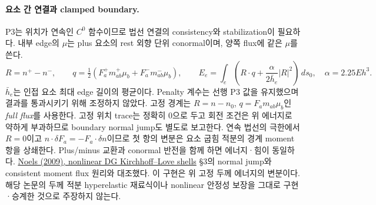 \documentclass[10pt]{article}
\begin{document}
\paragraph{요소 간 연결과 clamped boundary.}
P3는 위치가 연속인 \(C^0\) 함수이므로 법선 연결의 consistency와 stabilization이 필요하다.
내부 edge의 \(\mu\)는 plus 요소의 rest 외향 단위 conormal이며, 양쪽 flux에 같은 \(\mu\)를 쓴다.
\begin{equation}
 R=n^+-n^-,\qquad
 q=\tfrac12\left(F_a^+m_{ab}^+\mu_b+F_a^-m_{ab}^-\mu_b\right),\qquad
 E_e=\int_e\left(R\cdot q+\frac{\alpha}{2\bar h_e}|R|^2\right)\,ds_0,
 \quad \alpha=2.25Eh^3.
 \label{eq:r1-p3-shell-edge}
\end{equation}
\(\bar h_e\)는 인접 요소 최대 edge 길이의 평균이다. Penalty 계수는 선행 P3 값을 유지했으며
결과를 통과시키기 위해 조정하지 않았다. 고정 경계는 \(R=n-n_0\),
\(q=F_am_{ab}\mu_b\)인 \emph{full flux}를 사용한다. 고정 위치 trace는 정확히 0으로 두고
회전 조건은 위 에너지로 약하게 부과하므로 boundary normal jump도 별도로 보고한다.
연속 법선의 극한에서 \(R=0\)이고
\(n\cdot\delta F_a=-F_a\cdot\delta n\)이므로 첫 항의 변분은 요소 굽힘 적분의 경계 moment 항을 상쇄한다.
Plus/minus 교환과 conormal 반전을 함께 하면 에너지·힘이 동일하다.
\href{https://orbi.uliege.be/handle/2268/2093}{Noels (2009), nonlinear DG Kirchhoff--Love shells}
\S3의 normal jump와 consistent moment flux 원리와 대조했다. 이 구현은 위 고정 두께 에너지의 변분이다.
해당 논문의 두께 적분 hyperelastic 재료식이나 nonlinear 안정성 보장을 그대로 구현·승계한 것으로 주장하지 않는다.
\end{document}
